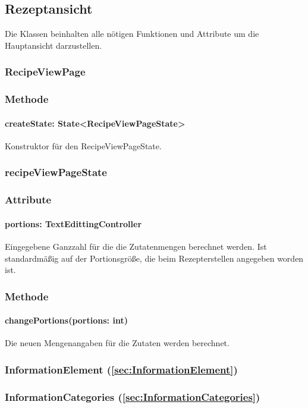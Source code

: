 \documentclass{entwurfsheft}
\begin{document}
\subsection{Rezeptansicht}
Die Klassen beinhalten alle nötigen Funktionen und Attribute um die Hauptansicht darzustellen.

\subsubsection{RecipeViewPage}\label{sec:RecipeViewPage}
\subsubsection*{Methode}
\paragraph*{createState: State<RecipeViewPageState>} Konstruktor für den RecipeViewPageState.

\subsubsection{recipeViewPageState}\label{sec:recipeViewPageState}
\subsubsection*{Attribute}
\paragraph*{portions: TextEdittingController} Eingegebene Ganzzahl für die die Zutatenmengen berechnet werden. Ist standardmäßig auf der Portionsgröße, die beim Rezepterstellen angegeben worden ist.

\subsubsection*{Methode}
\paragraph*{changePortions(portions: int)} Die neuen Mengenangaben für die Zutaten werden berechnet.

\subsubsection*{InformationElement (\ref{sec:InformationElement})}

\subsubsection{InformationCategories (\ref{sec:InformationCategories})}
\end{document}
